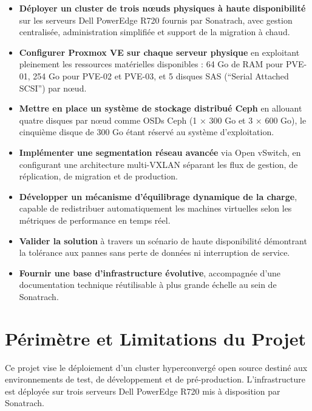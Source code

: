 \begin{itemize}

    \item \textbf{Déployer un cluster de trois n\oe{}uds physiques à haute disponibilité} sur les serveurs Dell PowerEdge R720 fournis par Sonatrach, avec gestion centralisée, administration simplifiée et support de la migration à chaud.

    \item \textbf{Configurer Proxmox VE sur chaque serveur physique} en exploitant pleinement les ressources matérielles disponibles : 64 Go de RAM pour PVE-01, 254 Go pour PVE-02 et PVE-03, et 5 disques SAS (``Serial Attached SCSI'') par n\oe{}ud.

    \item \textbf{Mettre en place un système de stockage distribué Ceph} en allouant quatre disques par n\oe{}ud comme OSDs Ceph (1 × 300 Go et 3 × 600 Go), le cinquième disque de 300 Go étant réservé au système d'exploitation.

    \item \textbf{Implémenter une segmentation réseau avancée} via Open vSwitch, en configurant une architecture multi-VXLAN séparant les flux de gestion, de réplication, de migration et de production.

    \item \textbf{Développer un mécanisme d'équilibrage dynamique de la charge}, capable de redistribuer automatiquement les machines virtuelles selon les métriques de performance en temps réel.

    \item \textbf{Valider la solution} à travers un scénario de haute disponibilité démontrant la tolérance aux pannes sans perte de données ni interruption de service.

    \item \textbf{Fournir une base d'infrastructure évolutive}, accompagnée d'une documentation technique réutilisable à plus grande échelle au sein de Sonatrach.

\end{itemize}

\section{Périmètre et Limitations du Projet}

\par Ce projet vise le déploiement d'un cluster hyperconvergé open source destiné aux environnements de test, de développement et de pré-production. L'infrastructure est déployée sur trois serveurs Dell PowerEdge R720 mis à disposition par Sonatrach.\\

